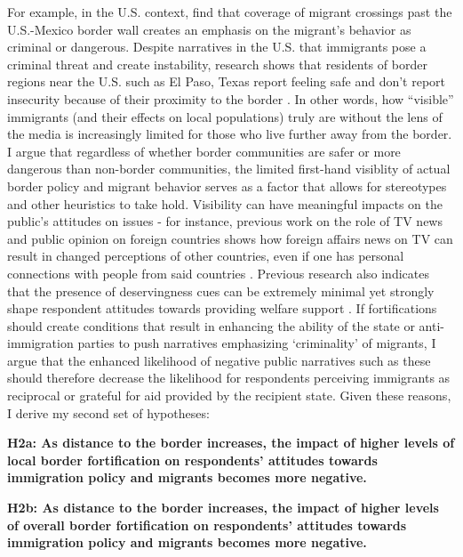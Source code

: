 \documentclass[12pt,]{article}
\begin{document}
For example, in the U.S. context, \citet{jaramillo-dent2021} find that
coverage of migrant crossings past the U.S.-Mexico border wall creates
an emphasis on the migrant's behavior as criminal or dangerous. Despite
narratives in the U.S. that immigrants pose a criminal threat and create
instability, research shows that residents of border regions near the
U.S. such as El Paso, Texas report feeling safe and don't report
insecurity because of their proximity to the border
\citep{castaneda2020}. In other words, how ``visible'' immigrants (and
their effects on local populations) truly are without the lens of the
media is increasingly limited for those who live further away from the
border. I argue that regardless of whether border communities are safer
or more dangerous than non-border communities, the limited first-hand
visiblity of actual border policy and migrant behavior serves as a
factor that allows for stereotypes and other heuristics to take hold.
Visibility can have meaningful impacts on the public's attitudes on
issues - for instance, previous work on the role of TV news and public
opinion on foreign countries shows how foreign affairs news on TV can
result in changed perceptions of other countries, even if one has
personal connections with people from said countries
\citep{semetko1992}. Previous research also indicates that the presence
of deservingness cues can be extremely minimal yet strongly shape
respondent attitudes towards providing welfare support
\citep{aaroe2014}. If fortifications should create conditions that
result in enhancing the ability of the state or anti-immigration parties
to push narratives emphasizing `criminality' of migrants, I argue that
the enhanced likelihood of negative public narratives such as these
should therefore decrease the likelihood for respondents perceiving
immigrants as reciprocal or grateful for aid provided by the recipient
state. Given these reasons, I derive my second set of hypotheses:

\textbf{H2a: As distance to the border increases, the impact of higher
levels of local border fortification on respondents' attitudes towards
immigration policy and migrants becomes more negative.}

\textbf{H2b: As distance to the border increases, the impact of higher
levels of overall border fortification on respondents' attitudes towards
immigration policy and migrants becomes more negative.}
\end{document}
